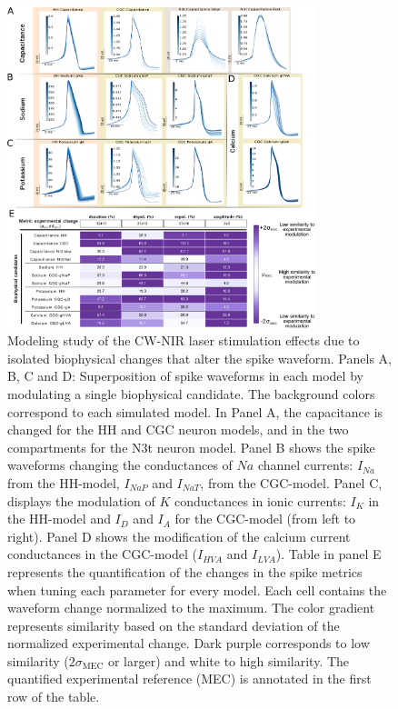 \begin{figure}[hbt!]
	\centering
	\includegraphics[width=0.8\textwidth]{img/laser/Figure4.pdf}
	
	\caption{Modeling study of the CW-NIR laser stimulation effects due to isolated biophysical changes that alter the spike waveform. Panels A, B, C and D: Superposition of spike waveforms in each model by modulating a single biophysical candidate. The background colors correspond to each simulated model. In Panel A, the capacitance is changed for the HH and CGC neuron models, and in the two compartments for the N3t neuron model. Panel B shows the spike waveforms changing the conductances of $Na$ channel currents: $I_{Na}$ from the HH-model, $I_{NaP}$ and $I_{NaT}$, from the CGC-model. Panel C, displays the modulation of $K$ conductances in ionic currents: $I_{K}$ in the HH-model and $I_{D}$ and $I_{A}$ for the CGC-model (from left to right). Panel D shows the modification of the calcium current conductances in the CGC-model ($I_{HVA}$ and $I_{LVA}$). Table in panel E represents the quantification of the changes in the spike metrics when tuning each parameter for every model. Each cell contains the waveform change normalized to the maximum. The color gradient represents similarity based on the standard deviation of the normalized experimental change. Dark purple corresponds to low similarity ($2\sigma_{\textrm{MEC}}$ or larger) and white to high similarity. The quantified experimental reference (MEC) is annotated in the first row of the table.}
	\label{fig:continuous_model}
\end{figure}

